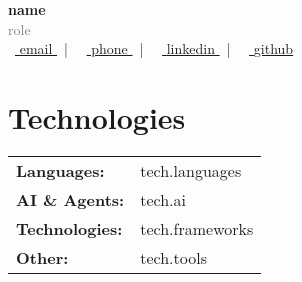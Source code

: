 \documentclass{article}
\begin{document}
\begin{center}
    {\LARGE \textbf{ {{ name }} }} \\
    \vspace{0.2em}
    \textcolor{gray}{ {{ role }} } \\
    \vspace{0.5em}
    \faEnvelope~\href{mailto:{{ email }}}{{ email }} ~|~
    \faPhone~\href{tel:{{ phone }}}{{ phone }} ~|~
    \faLinkedin~\href{ {{ linkedin }} }{ {{ linkedin }} } ~|~
    \faGithub~\href{ {{ github }} }{ {{ github }} }
\end{center}

\vspace{1em}
\section*{Technologies}
\begin{tabularx}{\textwidth}{@{} l X @{}}
\textbf{Languages:} & {{ tech.languages }} \\
\textbf{AI \& Agents:} & {{ tech.ai }} \\
\textbf{Technologies:} & {{ tech.frameworks }} \\
\textbf{Other:} & {{ tech.tools }} \\
\end{tabularx}
\end{document}
